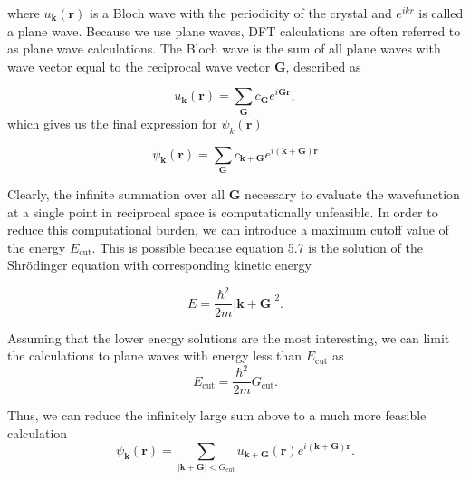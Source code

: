 where $u_{\boldsymbol{k}}(\boldsymbol{r})$ is a Bloch wave with the periodicity of the crystal and $e^{ikr}$ is called a plane wave. Because we use plane waves, DFT calculations are often referred to as plane wave calculations. The Bloch wave is the sum of all plane waves with wave vector equal to the reciprocal wave vector $\boldsymbol{G}$, described as 

\begin{equation}
    u_{\boldsymbol{k}}(\boldsymbol{r}) = \sum_{\boldsymbol{G}} c_{\boldsymbol{G}}e^{i\boldsymbol{G}\boldsymbol{r}},
\end{equation}
 which gives us the final expression for $\psi_k (\boldsymbol{r})$ 
 
\begin{equation}
    \psi_{\boldsymbol{k}}(\boldsymbol{r}) = \sum_{\boldsymbol{G}} c_{\boldsymbol{k} + \boldsymbol{G}}e^{i(\boldsymbol{k} + \boldsymbol{G})\boldsymbol{r}}
\end{equation}

Clearly, the infinite summation over all $\boldsymbol{G}$ necessary to evaluate the wavefunction at a single point in reciprocal space is computationally unfeasible. In order to reduce this computational burden, we can introduce a maximum cutoff value of the energy $E_{\text{cut}}$. This is possible because equation 5.7 is the solution of the Shr\"{o}dinger equation with corresponding kinetic energy 

\begin{equation}
    E = \frac{\hbar^2}{2m}|\boldsymbol{k} + \boldsymbol{G}|^2.
\end{equation}

Assuming that the lower energy solutions are the most interesting, we can limit the calculations to plane waves with energy less than $E_{\text{cut}}$ as
\begin{equation}
    E_{\text{cut}} = \frac{\hbar^2}{2m}G_{\text{cut}}.
\end{equation}

Thus, we can reduce the infinitely large sum above to a much more feasible calculation
\begin{equation}
    \psi_{\boldsymbol{k}}(\boldsymbol{r}) = \sum_{|\boldsymbol{k} + \boldsymbol{G}| < G_{\text{cut}}} u_{\boldsymbol{k} + \boldsymbol{G}}(\boldsymbol{r})e^{i(\boldsymbol{k} + \boldsymbol{G})\boldsymbol{r}}.
\end{equation}

